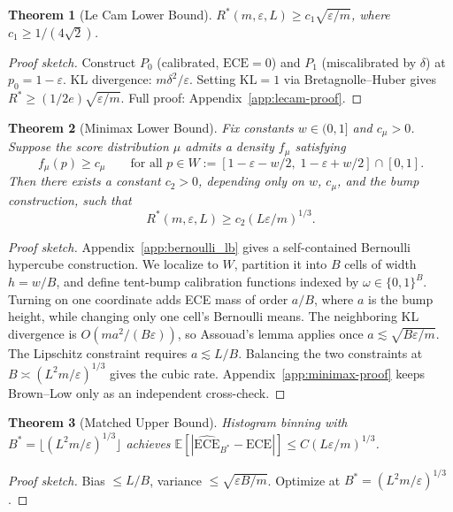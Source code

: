 \documentclass{article}
\newcommand{\ECE}{\mathrm{ECE}}
\newcommand{\Lip}{L}
\newcommand{\errrate}{\varepsilon}
\newcommand{\nsamples}{m}
\newcommand{\scoredist}{\mu}
\providecommand{\E}{}
\renewcommand{\E}{\mathbb{E}}
\providecommand{\KL}{}
\renewcommand{\KL}{\mathrm{KL}}
\newcommand{\targetacc}{\delta}
\newtheorem{theorem}{Theorem}
\theoremstyle{definition}
\begin{document}
\begin{theorem}[Le Cam Lower Bound]
\label{thm:lecam}
$R^*(\nsamples, \errrate, \Lip) \geq c_1 \sqrt{\errrate/\nsamples}$, where $c_1 \geq 1/(4\sqrt{2})$.
\end{theorem}
\begin{proof}[Proof sketch]
Construct $P_0$ (calibrated, $\ECE = 0$) and $P_1$ (miscalibrated by $\targetacc$) at $p_0 = 1-\errrate$. KL divergence: $\nsamples\targetacc^2/\errrate$. Setting $\KL=1$ via Bretagnolle--Huber gives $R^* \geq (1/2e)\sqrt{\errrate/\nsamples}$. Full proof: Appendix~\ref{app:lecam-proof}.
\end{proof}

\begin{theorem}[Minimax Lower Bound]
\label{thm:minimax-lb}
Fix constants $w \in (0,1]$ and $c_\scoredist > 0$. Suppose the score distribution $\scoredist$ admits a density $f_\scoredist$ satisfying
\[
f_\scoredist(p) \geq c_\scoredist \qquad \text{for all } p \in W := [1{-}\errrate{-}w/2,\; 1{-}\errrate{+}w/2] \cap [0,1].
\]
Then there exists a constant $c_2 > 0$, depending only on $w$, $c_\scoredist$, and the bump construction, such that
\[
R^*(\nsamples, \errrate, \Lip) \geq c_2 (\Lip \errrate/\nsamples)^{1/3}.
\]
\end{theorem}
\begin{proof}[Proof sketch]
Appendix~\ref{app:bernoulli_lb} gives a self-contained Bernoulli hypercube construction. We localize to $W$, partition it into $B$ cells of width $h=w/B$, and define tent-bump calibration functions indexed by $\omega \in \{0,1\}^B$. Turning on one coordinate adds ECE mass of order $a/B$, where $a$ is the bump height, while changing only one cell's Bernoulli means. The neighboring KL divergence is $O(\nsamples a^2/(B\errrate))$, so Assouad's lemma applies once $a \lesssim \sqrt{B\errrate/\nsamples}$. The Lipschitz constraint requires $a \lesssim \Lip/B$. Balancing the two constraints at $B \asymp (\Lip^2 \nsamples/\errrate)^{1/3}$ gives the cubic rate. Appendix~\ref{app:minimax-proof} keeps Brown--Low only as an independent cross-check.
\end{proof}

\begin{theorem}[Matched Upper Bound]
\label{thm:upper-bound}
Histogram binning with $B^* = \lfloor(\Lip^2\nsamples/\errrate)^{1/3}\rfloor$ achieves $\E[|\widehat{\ECE}_{B^*} - \ECE|] \leq C(\Lip\errrate/\nsamples)^{1/3}$.
\end{theorem}
\begin{proof}[Proof sketch]
Bias $\leq \Lip/B$, variance $\leq \sqrt{\errrate B/\nsamples}$. Optimize at $B^* = (\Lip^2\nsamples/\errrate)^{1/3}$.
\end{proof}
\end{document}
